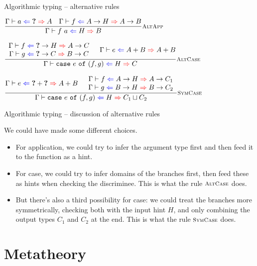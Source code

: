 \documentclass{beamer}
\begin{document}
\begin{frame}{Algorithmic typing -- alternative rules}

\begin{center}
  $\infrule[AltApp]{\hinting{a}{\Hole}{A} \quad \hinting{f}{\Fun{A}{H}}{\Fun{A}{B}}}{\hinting{\app{f}{a}}{H}{B}}$

  \vspace{2em}

  $\infrule[AltCase]{\begin{array}{c} \hinting{f}{\Fun{\Hole}{H}}{\Fun{A}{C}} \\ \hinting{g}{\Fun{\Hole}{C}}{\Fun{B}{C}} \end{array} \quad \hinting{e}{\Sum{A}{B}}{\Sum{A}{B}}}{\hinting{\case{e}{f}{g}}{H}{C}}$

  \vspace{2em}

  $\infrule[SymCase]{\hinting{e}{\Sum{\Hole}{\Hole}}{\Sum{A}{B}} \quad \begin{array}{c} \hinting{f}{\Fun{A}{H}}{\Fun{A}{C_1}} \\ \hinting{g}{\Fun{B}{H}}{\Fun{B}{C_2}} \end{array}}{\hinting{\case{e}{f}{g}}{H}{\hintlub{C_1}{C_2}}}$
\end{center}

\end{frame}

\begin{frame}{Algorithmic typing -- discussion of alternative rules}

We could have made some different choices.

\begin{itemize}
  \item For application, we could try to infer the argument type first and then feed it to the function as a hint.
  \item For case, we could try to infer domains of the branches first, then feed these as hints when checking the discriminee. This is what the rule $\textsc{\footnotesize{AltCase}}$ does.
  \item But there's also a third possibility for case: we could treat the branches more symmetrically, checking both with the input hint $H$, and only combining the output types $C_1$ and $C_2$ at the end. This is what the rule $\textsc{\footnotesize{SymCase}}$ does.
\end{itemize}

\end{frame}

\section{Metatheory}
\end{document}
